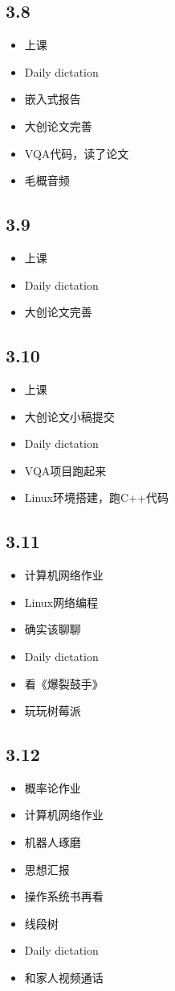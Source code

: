 \documentclass[UTF8]{ctexart}
\begin{document}
\subsection*{3.8}
\begin{itemize}
    \item 上课
    \item Daily dictation
    \item 嵌入式报告
    \item 大创论文完善
    \item VQA代码，读了论文
    \item 毛概音频
\end{itemize}
\subsection*{3.9}
\begin{itemize}
    \item 上课
    \item Daily dictation
    \item 大创论文完善
\end{itemize}
\subsection*{3.10}
\begin{itemize}
    \item 上课
    \item 大创论文小稿提交
    \item Daily dictation
    \item VQA项目跑起来
    \item Linux环境搭建，跑C++代码
\end{itemize}
\subsection*{3.11}
\begin{itemize}
    \item 计算机网络作业
    \item Linux网络编程
    \item 确实该聊聊
    \item Daily dictation
    \item 看《爆裂鼓手》
    \item 玩玩树莓派
\end{itemize}
\subsection*{3.12}
\begin{itemize}
    \item 概率论作业
    \item 计算机网络作业
    \item 机器人琢磨
    \item 思想汇报
    \item 操作系统书再看
    \item 线段树
    \item Daily dictation
    \item 和家人视频通话
\end{itemize}
\end{document}
